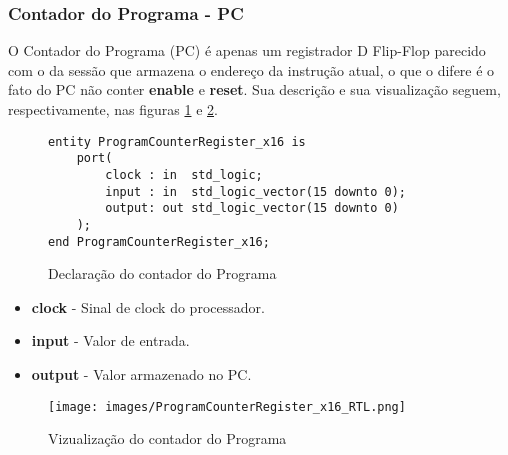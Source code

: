 \documentclass{article}
\newcommand\tab[1][0.50cm]{\hspace*{#1}}
\begin{document}
			\subsubsection[PC]{Contador do Programa - PC}
				\tab O Contador do Programa (PC) \'{e} apenas um registrador D Flip-Flop parecido com o da sess\~{a}o que armazena o endere\c{c}o da instru\c{c}\~{a}o atual, o que o difere \'{e} o fato do PC n\~{a}o conter \textbf{enable} e \textbf{reset}. Sua descri\c{c}\~{a}o e sua visualiza\c{c}\~{a}o seguem, respectivamente, nas figuras \ref{fig:ProgramCounterRegister_x16} e \ref{fig:ProgramCounterRegister_x16_RTL}.
				\begin{figure}[H]
					\centering
					\caption[Contador do Programa]{Declara\c{c}\~{a}o do contador do Programa}
					\label{fig:ProgramCounterRegister_x16}
					\begin{lstlisting}[style=vhdl]
entity ProgramCounterRegister_x16 is 
	port(
		clock : in  std_logic;
		input : in  std_logic_vector(15 downto 0);
		output: out std_logic_vector(15 downto 0)
	);
end ProgramCounterRegister_x16;
					\end{lstlisting}
				\end{figure}
				\begin{itemize}
					\item \textbf{clock} - Sinal de clock do processador.
					\item \textbf{input} - Valor de entrada.
					\item \textbf{output} - Valor armazenado no PC.
				\end{itemize}
				\begin{figure}[H]
					\centering
					\caption[Vizualiza\c{c}\~{a}o do contador do Programa]{Vizualiza\c{c}\~{a}o do contador do Programa}
					\label{fig:ProgramCounterRegister_x16_RTL}
					\texttt{[image: images/ProgramCounterRegister\_x16\_RTL.png]}
				\end{figure}
\end{document}
